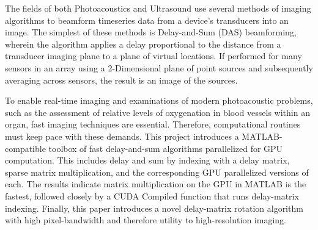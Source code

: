 
The fields of both Photoacoustics and Ultrasound use several methods of imaging algorithms to beamform timeseries data from a device's transducers into an image. The simplest of these methods is Delay-and-Sum (DAS) beamforming, wherein the algorithm applies a delay proportional to the distance from a transducer imaging plane to a plane of virtual locations. If performed for many sensors in an array using a 2-Dimensional plane of point sources and subsequently averaging across sensors, the result is an image of the sources.

To enable real-time imaging and examinations of modern photoacoustic problems, such as the assessment of relative levels of oxygenation in blood vessels within an organ, fast imaging techniques are essential. Therefore, computational routines must keep pace with these demands. This project introduces a MATLAB-compatible toolbox of fast delay-and-sum algorithms parallelized for GPU computation. This includes delay and sum by indexing with a delay matrix, sparse matrix multiplication, and the corresponding GPU parallelized versions of each. The results indicate matrix multiplication on the GPU in MATLAB is the fastest, followed closely by a CUDA Compiled function that runs delay-matrix indexing. Finally, this paper introduces a novel delay-matrix rotation algorithm with high pixel-bandwidth and therefore utility to high-resolution imaging.